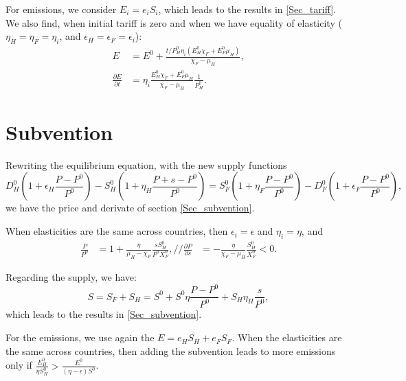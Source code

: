 For emissions, we consider $E_i = e_i S_i$, which leads to the results in \ref{Sec_tariff}. We also find, when initial tariff is zero and when we have equality of elasticity ($\eta_H = \eta_F = \eta_i$, and $\epsilon_H = \epsilon_F = \epsilon_i$):
\begin{align*}
E &= E^0 + \frac{t/P_H^0 \eta_i(E_H^0 \chi_F + E_F^0 \mu_H)}{\chi_F - \mu_H }, \\ \frac{\partial E}{\partial t} &=  \eta_i \frac{E_H^0 \chi_F + E_F^0 \mu_H}{\chi_F-\mu_H}\frac{1}{P_H^0}.
\end{align*}

\section{Subvention}\label{appendix:intuitions_subvention}

Rewriting the equilibrium equation, with the new supply functions
$$
D_H^0\left(1+\epsilon_H \frac{P - P^0}{P^0}\right) - S_H^0\left(1+\eta_H \frac{P + s - P^0}{P^0}\right) = S_F^0 \left(1+\eta_F \frac{P - P^0}{P^0}\right) - D_F^0\left(1+\epsilon_F \frac{P - P^0}{P^0}\right),
$$
we have the price and derivate of section \ref{Sec_subvention}.

When elasticities are the same across countries, then $\epsilon_i = \epsilon$ and $\eta_i = \eta$, and 
\begin{align*}
\frac{P}{P^0} &= 1 + \frac{\eta}{\mu_H - \chi_F} \frac{s S_H^0}{P^0 X_F^0}, //
\frac{\partial P}{\partial s} &= -\frac{\eta}{\chi_F-\mu_H} \frac{S_H^0}{X_F^0}<0.
\end{align*}

Regarding the supply, we have:
$$
S = S_F + S_H =  S^0 + S^0 \eta \frac{P- P^0}{P^0} + S_H \eta_H \frac {s}{P^0},
$$
which leads to the results in \ref{Sec_subvention}.

For the emissions, we use again the $E = e_H S_H + e_F S_F$. When the elasticities are the same across countries, then adding the subvention leads to more emissions only if $\frac{E_H^0}{\eta S_H^0} > \frac{E^0}{(\eta - \epsilon)S^0}$.
